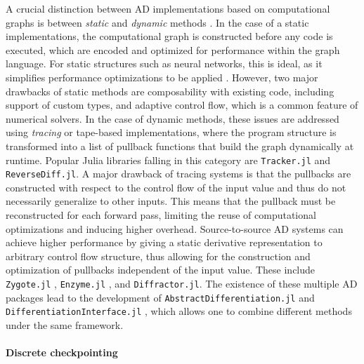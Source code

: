 A crucial distinction between AD implementations based on computational graphs is between \textit{static} and \textit{dynamic} methods \cite{Baydin_Pearlmutter_Radul_Siskind_2015}. 
In the case of a static implementations, the computational graph is constructed before any code is executed, which are encoded and optimized for performance within the graph language. 
For static structures such as neural networks, this is ideal, as it simplifies performance optimizations to be applied \cite{abadi-tensorflow}. 
However, two major drawbacks of static methods are composability with existing code, including support of custom types, and adaptive control flow, which is a common feature of numerical solvers. 
In the case of dynamic methods, these issues are addressed using \textit{tracing} or tape-based implementations, where the program structure is transformed into a list of pullback functions that build the graph dynamically at runtime. 
Popular Julia libraries falling in this category are \texttt{Tracker.jl} and \texttt{ReverseDiff.jl}. 
A major drawback of tracing systems is that the pullbacks are constructed with respect to the control flow of the input value and thus do not necessarily generalize to other inputs. 
This means that the pullback must be reconstructed for each forward pass, limiting the reuse of computational optimizations and inducing higher overhead. 
Source-to-source AD systems can achieve higher performance by giving a static derivative representation to arbitrary control flow structure, thus allowing for the construction and optimization of pullbacks independent of the input value. 
These include \texttt{Zygote.jl} \cite{Innes_Zygote}, \texttt{Enzyme.jl} \cite{moses_Enzyme, Moses.2021}, and \texttt{Diffractor.jl}.
The existence of these multiple AD packages lead to the development of \texttt{AbstractDifferentiation.jl} \cite{Schäfer_Tarek_White_Rackauckas_2021} and \texttt{DifferentiationInterface.jl} \cite{dalle_2024_11573435}, which allows one to combine different methods under the same framework. 


\paragraph{Discrete checkpointing}
\label{section:checkpointing}

